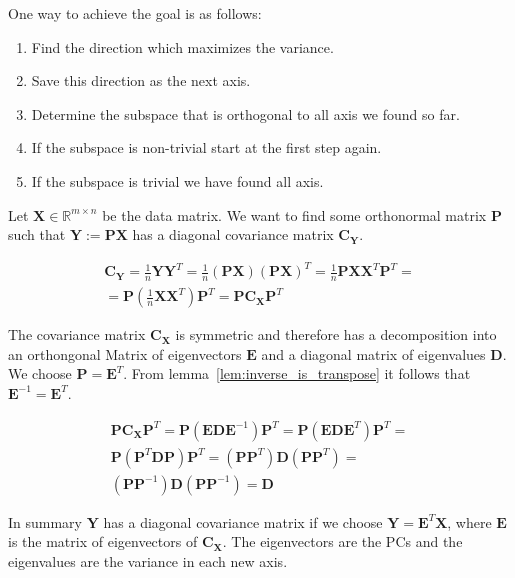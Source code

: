 \documentclass[a4paper]{IEEEtran}
\begin{document}
One way to achieve the goal is as follows:
\begin{enumerate}
	\item Find the direction which maximizes the variance.
	\item Save this direction as the next axis.
	\item Determine the subspace that is orthogonal to all axis we found so far.
	\item If the subspace is non-trivial start at the first step again.
	\item If the subspace is trivial we have found all axis.
\end{enumerate}

Let $\mathbf{X} \in \mathbb{R}^{m\times n}$ be the data matrix. We want to find some orthonormal matrix $\mathbf{P}$ such that $\mathbf{Y}:=\mathbf{PX}$ has a diagonal covariance matrix $\mathbf{C}_{\mathbf{Y}}$.

\begin{align*}
	\mathbf{C}_{\mathbf{Y}} = \frac{1}{n}\mathbf{YY}^T = \frac{1}{n}(\mathbf{PX})(\mathbf{PX})^T = \frac{1}{n}\mathbf{PX}\mathbf{X}^T\mathbf{P}^T =\\
	= \mathbf{P}(\frac{1}{n}\mathbf{X}\mathbf{X}^T)\mathbf{P}^T = \mathbf{P}\mathbf{C}_\mathbf{X}\mathbf{P}^T
\end{align*}

The covariance matrix $\mathbf{C}_\mathbf{X}$ is symmetric and therefore has a decomposition into an orthongonal Matrix of eigenvectors $\mathbf{E}$ and a diagonal matrix of eigenvalues $\mathbf{D}$. We choose $\mathbf{P}=\mathbf{E}^T$. From lemma~\ref{lem:inverse_is_transpose} it follows that $\mathbf{E}^{-1} = \mathbf{E}^T$.

\begin{align*}
	\mathbf{P}\mathbf{C}_\mathbf{X}\mathbf{P}^T = \mathbf{P}(\mathbf{EDE}^{-1})\mathbf{P}^T = \mathbf{P}(\mathbf{EDE}^{T})\mathbf{P}^T =\\
	\mathbf{P}(\mathbf{P}^T\mathbf{DP})\mathbf{P}^T = (\mathbf{P}\mathbf{P}^T)\mathbf{D}(\mathbf{P}\mathbf{P}^T) =\\
	(\mathbf{P}\mathbf{P}^{-1})\mathbf{D}(\mathbf{P}\mathbf{P}^{-1}) = \mathbf{D}
\end{align*}

In summary $\mathbf{Y}$ has a diagonal covariance matrix if we choose $\mathbf{Y} = \mathbf{E}^T\mathbf{X}$, where $\mathbf{E}$ is the matrix of eigenvectors of $\mathbf{C}_\mathbf{X}$. The eigenvectors are the PCs and the eigenvalues are the variance in each new axis.
\end{document}
